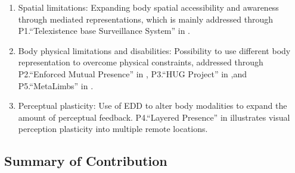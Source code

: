 \begin{enumerate}
 \setlength\itemsep{0em}
\item Spatial limitations: Expanding body spatial accessibility and awareness through mediated representations, which is mainly addressed through P1.``Telexistence base Surveillance System'' in .

\item Body physical limitations and disabilities: Possibility to use different body representation to overcome physical constraints, addressed through P2.``Enforced Mutual Presence'' in , P3.``HUG Project'' in ,and P5.``MetaLimbs'' in .

\item Perceptual plasticity: Use of EDD to alter body modalities to expand the amount of perceptual feedback. P4.``Layered Presence'' in  illustrates visual perception plasticity into multiple remote locations.

\end{enumerate}




\subsection{Summary of Contribution} 

